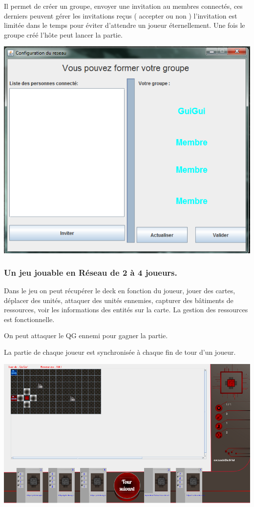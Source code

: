 \documentclass[a4paper,11pt]{report}
\begin{document}
	Il permet de créer un groupe, envoyer une invitation au membres connectés, ces derniers peuvent gérer les invitations reçus ( accepter ou non ) l'invitation est limitée dans le temps pour éviter d'attendre un joueur éternellement. Une fois le groupe créé l'hôte peut lancer la partie.   
	
	
	\begin{center}
	\includegraphics[scale=0.5]{Assets/connection3.png} 
	\end{center}
	
	\subsubsection{Un jeu jouable en Réseau de 2 à 4 joueurs.}
	
	Dans le jeu on peut récupérer le deck en fonction du joueur, jouer des cartes, déplacer des unités, attaquer des unités ennemies, capturer des bâtiments de ressources, voir les informations des entités sur la carte. La gestion des ressources est fonctionnelle.
	
	 On peut attaquer le QG ennemi pour gagner la partie.
	
 La partie de chaque joueur est synchronisée à chaque fin de tour d'un joueur.
	\begin{center}
	\includegraphics[scale=0.3]{Assets/UniteeSelectMove.png} 
	\end{center}
	


	
\end{document}
